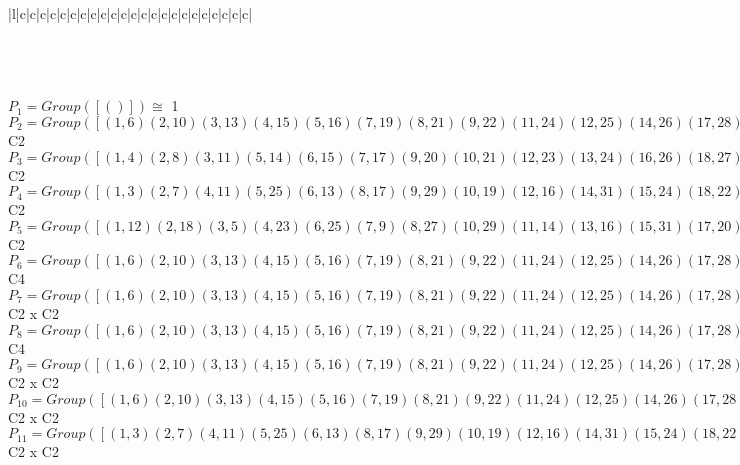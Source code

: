 \documentclass[varwidth=\maxdimen,border=10]{standalone}
\begin{document}
\begin{tabular}
\begin{array}{|l|c|c|c|c|c|c|c|c|c|c|c|c|c|c|c|c|c|c|c|c|c|c|c|}
\end{array}\)\\
\ \\
\ \\
$P_{1} = Group( [ () ] )\cong$ 1\ \\
$P_{2} = Group( [ ( 1, 6)( 2,10)( 3,13)( 4,15)( 5,16)( 7,19)( 8,21)( 9,22)(11,24)(12,25)(14,26)(17,28)(18,29)(20,30)(23,31)(27,32) ] )\cong$ C2\ \\
$P_{3} = Group( [ ( 1, 4)( 2, 8)( 3,11)( 5,14)( 6,15)( 7,17)( 9,20)(10,21)(12,23)(13,24)(16,26)(18,27)(19,28)(22,30)(25,31)(29,32) ] )\cong$ C2\ \\
$P_{4} = Group( [ ( 1, 3)( 2, 7)( 4,11)( 5,25)( 6,13)( 8,17)( 9,29)(10,19)(12,16)(14,31)(15,24)(18,22)(20,32)(21,28)(23,26)(27,30) ] )\cong$ C2\ \\
$P_{5} = Group( [ ( 1,12)( 2,18)( 3, 5)( 4,23)( 6,25)( 7, 9)( 8,27)(10,29)(11,14)(13,16)(15,31)(17,20)(19,22)(21,32)(24,26)(28,30) ] )\cong$ C2\ \\
$P_{6} = Group( [ ( 1, 6)( 2,10)( 3,13)( 4,15)( 5,16)( 7,19)( 8,21)( 9,22)(11,24)(12,25)(14,26)(17,28)(18,29)(20,30)(23,31)(27,32), ( 1, 5, 6,16)( 2, 9,10,22)( 3,12,13,25)( 4,14,15,26)( 7,18,19,29)( 8,20,21,30)(11,23,24,31)(17,27,28,32) ] )\cong$ C4\ \\
$P_{7} = Group( [ ( 1, 6)( 2,10)( 3,13)( 4,15)( 5,16)( 7,19)( 8,21)( 9,22)(11,24)(12,25)(14,26)(17,28)(18,29)(20,30)(23,31)(27,32), ( 1, 4)( 2, 8)( 3,11)( 5,14)( 6,15)( 7,17)( 9,20)(10,21)(12,23)(13,24)(16,26)(18,27)(19,28)(22,30)(25,31)(29,32) ] )\cong$ C2 x C2\ \\
$P_{8} = Group( [ ( 1, 6)( 2,10)( 3,13)( 4,15)( 5,16)( 7,19)( 8,21)( 9,22)(11,24)(12,25)(14,26)(17,28)(18,29)(20,30)(23,31)(27,32), ( 1,14, 6,26)( 2,20,10,30)( 3,23,13,31)( 4, 5,15,16)( 7,27,19,32)( 8, 9,21,22)(11,12,24,25)(17,18,28,29) ] )\cong$ C4\ \\
$P_{9} = Group( [ ( 1, 6)( 2,10)( 3,13)( 4,15)( 5,16)( 7,19)( 8,21)( 9,22)(11,24)(12,25)(14,26)(17,28)(18,29)(20,30)(23,31)(27,32), ( 1, 3)( 2, 7)( 4,11)( 5,25)( 6,13)( 8,17)( 9,29)(10,19)(12,16)(14,31)(15,24)(18,22)(20,32)(21,28)(23,26)(27,30) ] )\cong$ C2 x C2\ \\
$P_{10} = Group( [ ( 1, 6)( 2,10)( 3,13)( 4,15)( 5,16)( 7,19)( 8,21)( 9,22)(11,24)(12,25)(14,26)(17,28)(18,29)(20,30)(23,31)(27,32), ( 1,12)( 2,18)( 3, 5)( 4,23)( 6,25)( 7, 9)( 8,27)(10,29)(11,14)(13,16)(15,31)(17,20)(19,22)(21,32)(24,26)(28,30) ] )\cong$ C2 x C2\ \\
$P_{11} = Group( [ ( 1, 3)( 2, 7)( 4,11)( 5,25)( 6,13)( 8,17)( 9,29)(10,19)(12,16)(14,31)(15,24)(18,22)(20,32)(21,28)(23,26)(27,30), ( 1, 4)( 2, 8)( 3,11)( 5,14)( 6,15)( 7,17)( 9,20)(10,21)(12,23)(13,24)(16,26)(18,27)(19,28)(22,30)(25,31)(29,32) ] )\cong$ C2 x C2\ \\

\end{tabular}
\end{document}
